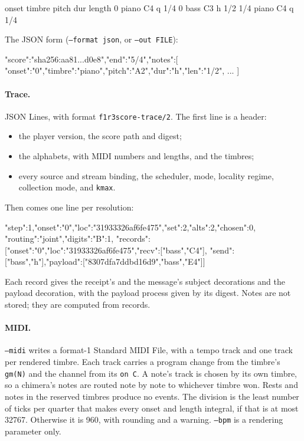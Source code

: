 \documentclass[11pt,a4paper]{article}
\newcommand{\ttx}[1]{\texttt{#1}}
\begin{document}
\begin{out}
     onset  timbre     pitch  dur     length
         0  piano      C4     q          1/4
         0  bass       C3     h          1/2
       1/4  piano      C4     q          1/4
\end{out}

\noindent The JSON form (\ttx{--format json}, or \ttx{--out FILE}):
\begin{out}
{"score":"sha256:aa81...d0e8","end":"5/4","notes":[
  {"onset":"0","timbre":"piano","pitch":"A2","dur":"h","len":"1/2"}, ... ]}
\end{out}

\paragraph{Trace.} JSON Lines, with format \ttx{f1r3score-trace/2}. The first
line is a header:
\begin{itemize}
\item the player version, the score path and digest;
\item the alphabets, with MIDI numbers and lengths, and the timbres;
\item every source and stream binding, the scheduler, mode, locality regime,
  collection mode, and \ttx{kmax}.
\end{itemize}
Then comes one line per resolution:
\begin{out}
{"step":1,"onset":"0","loc":"31933326af6fe475","set":2,"alts":2,"chosen":0,
 "routing":"joint","digits":{"B":1},
 "records":[{"onset":"0","loc":"31933326af6fe475","recv":["bass","C4"],
             "send":["bass","h"],"payload":["8307dfa7ddbd16d9","bass","E4"]}]}
\end{out}
\noindent Each record gives the receipt's and the message's subject
decorations and the payload decoration, with the payload process given by its
digest. Notes are not stored; they are computed from records.

\paragraph{MIDI.} \ttx{--midi} writes a format-1 Standard MIDI File, with a
tempo track and one track per rendered timbre. Each track carries a program
change from the timbre's \ttx{gm(N)} and the channel from its \ttx{on C}. A
note's track is chosen by its own timbre, so a chimera's notes are routed note
by note to whichever timbre won. Rests and notes in the reserved timbres
produce no events. The division is the least number of ticks per quarter that
makes every onset and length integral, if that is at most 32767. Otherwise it
is 960, with rounding and a warning. \ttx{--bpm} is a rendering parameter only.
\end{document}
